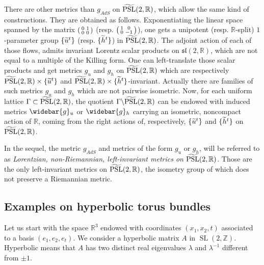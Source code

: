 \documentclass[11pt]{article}
\theoremstyle{definition}
\numberwithin{equation}{section}
\numberwithin{figure}{section}
\numberwithin{table}{section}
\DeclareMathOperator{\PSL}{PSL}
\DeclareMathOperator{\SL}{SL}
\newcommand*\RR{\mathbb{R}}
\newcommand*\ZZ{\mathbb{Z}}
\let\oldtilde\tilde
\renewcommand*\tilde[1]{\mathchoice{\widetilde{#1}}{\widetilde{#1}}{\widetilde{#1}}{\oldtilde{#1}}}
\let\oldbar\bar
\renewcommand*{\bar}[1]{\mathchoice{\widebar{#1}}{\widebar{#1}}{\oldbar{#1}}{\oldbar{#1}}}
\renewcommand*{\overline}{\bar}
\newenvironment{smallpmatrix}{\left(\begin{smallmatrix}}{\end{smallmatrix}\right)}
\begin{document}
There are other metrics than $g_{AdS}$ on $\tilde{\PSL}(2,\RR)$, which allow the same kind of constructions. They are obtained as follows. Exponentiating the linear space spanned by the matrix 
$\begin{smallpmatrix}
0&1\\
0&0\\
\end{smallpmatrix}$
(resp. $
\begin{smallpmatrix}
1&0\\
0&-1\\
\end{smallpmatrix}$), one gets a unipotent (resp. $\RR$-split) $1$-parameter group $\{\tilde{u}^t\}$ (resp. $\{ \tilde{h}^t \}$) in $\tilde{\PSL}(2,\RR)$. The adjoint action of each of those flows, admits invariant Lorentz scalar products on $\mathfrak{sl}(2,\RR)$, which are not equal to a multiple of the Killing form. One can left-translate those scalar products and get metrics $g_u$ and $g_h$ on $\tilde{\PSL}(2,\RR)$ which are respectively $\tilde{\PSL}(2,\RR)
\times \{\tilde{u}^t\}$ and $\tilde{\PSL}(2,\RR)
\times \{\tilde{h}^t\}$-invariant. Actually there are families of such metrics $g_u$ and $g_h$ which are not pairwise isometric. Now, for each uniform lattice $\Gamma \subset \tilde{\PSL}(2,\RR)$, the quotient $\Gamma \backslash \tilde{\PSL}(2,\RR)$ can be endowed with induced metrics $\overline{g}_u$ or $\overline{g}_h$ carrying an isometric, noncompact action of $\RR$, coming from the right actions of, respectively, $\{\tilde{u}^t\}$ and $\{\tilde{h}^t\}$ on $\tilde{\PSL}(2,\RR)$.

In the sequel, the metric $g_{AdS}$ and metrics of the form $g_u$ or $g_h$, will be referred to as \emph{Lorentzian, non-Riemannian, left-invariant metrics on} $\tilde{\PSL}(2,\RR)$. Those are the only left-invariant metrics on $\tilde{\PSL}(2,\RR)$, the isometry group of which does not preserve a Riemannian metric.



\subsection{Examples on hyperbolic torus bundles}\label{sec.exempleshyperboliques}


Let us start with the space $\RR^3$ endowed with coordinates $(x_1,x_2,t)$ associated to a basis $(e_1,e_2,e_t)$. We consider a hyperbolic matrix $A$ in $\SL(2,\ZZ)$. Hyperbolic means that $A$ has two distinct real eigenvalues $\lambda$ and $\lambda^{-1}$ different from $\pm 1$.
\end{document}

